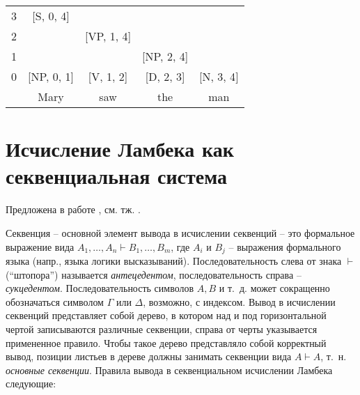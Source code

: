\begin{example}
\begin{tabular}[t]{ccccc}
\cline{2-2}
\multicolumn{1}{c|}{3} & \multicolumn{1}{c|}{{[}S, 0, 4{]}}  &                                     &                                     &                                    \\ \cline{2-3}
\multicolumn{1}{c|}{2} & \multicolumn{1}{c|}{}               & \multicolumn{1}{c|}{{[}VP, 1, 4{]}} &                                     &                                    \\ \cline{2-4}
\multicolumn{1}{c|}{1} & \multicolumn{1}{c|}{}               & \multicolumn{1}{c|}{}               & \multicolumn{1}{c|}{{[}NP, 2, 4{]}} &                                    \\ \cline{2-5} 
\multicolumn{1}{c|}{0} & \multicolumn{1}{c|}{{[}NP, 0, 1{]}} & \multicolumn{1}{c|}{{[}V, 1, 2{]}}  & \multicolumn{1}{c|}{{[}D, 2, 3{]}}  & \multicolumn{1}{c|}{{[}N, 3, 4{]}} \\ \cline{2-5} 
                       & Mary                                & saw                                 & the                                 & man                               
\end{tabular}

\end{example}


\section{Исчисление Ламбека как секвенциальная система}

Предложена в работе \parencite{lambek1958mathematics}, см. тж. \parencite{moot2012logic}.

Секвенция -- основной элемент вывода в исчислении секвенций -- это формальное выражение вида $A_1, \dots, A_n \vdash B_1, \dots, B_m$, где $A_i$ и $B_j$ -- выражения формального языка (напр., языка логики высказываний). Последовательность слева от знака $\vdash$ (``штопора'') называется \textit{антецедентом}, последовательность справа -- \textit{сукцедентом}. Последовательность символов $A, B$ и т.~д. может сокращенно обозначаться символом $\Gamma$ или $\Delta$, возможно, с индексом. Вывод в исчислении секвенций представляет собой дерево, в котором над и под горизонтальной чертой записываются различные секвенции, справа от черты указывается примененное правило. Чтобы такое дерево представляло собой корректный вывод, позиции листьев в дереве должны занимать секвенции вида $A \vdash A$, т.~н. \textit{основные секвенции}. Правила вывода в секвенциальном исчислении Ламбека следующие:

